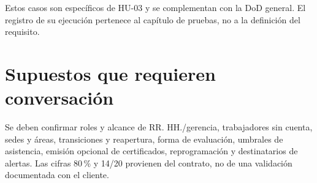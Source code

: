 Estos casos son específicos de HU-03 y se complementan con la DoD general. El registro de su ejecución pertenece al capítulo de pruebas, no a la definición del requisito.

\section{Supuestos que requieren conversación}
Se deben confirmar roles y alcance de RR. HH./gerencia, trabajadores sin cuenta, sedes y áreas, transiciones y reapertura, forma de evaluación, umbrales de asistencia, emisión opcional de certificados, reprogramación y destinatarios de alertas. Las cifras 80\,\% y 14/20 provienen del contrato, no de una validación documentada con el cliente.
